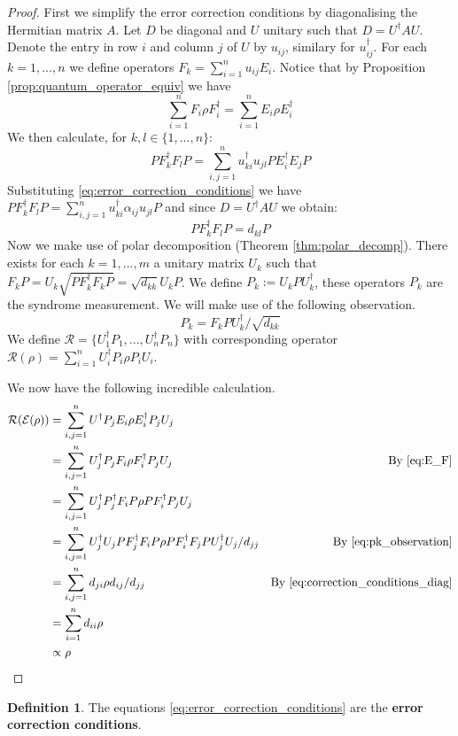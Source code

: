 \documentclass[12pt]{article}
\theoremstyle{plain}
\theoremstyle{definition}
\newtheorem{defn}[thm]{Definition} %
\newcommand{\call}[1]{\mathcal{#1}}
\begin{document}
\begin{proof}
		First we simplify the error correction conditions by diagonalising the Hermitian matrix $A$. Let $D$ be diagonal and $U$ unitary such that $D = U^\dagger A U$. Denote the entry in row $i$ and column $j$ of $U$ by $u_{ij}$, similary for $u_{ij}^\dagger$. For each $k = 1,...,n$ we define operators $F_k = \sum_{i = 1}^n u_{ij}E_i$. Notice that by Proposition \ref{prop:quantum_operator_equiv} we have
		\begin{equation}\label{eq:E_F}
			\sum_{i = 1}^n F_i \rho F_i^\dagger = \sum_{i = 1}^n E_i \rho E_i^\dagger
		\end{equation}
		We then calculate, for $k,l \in \lbrace 1,...,n\rbrace$:
		\begin{equation}
			PF_k^\dagger F_l P = \sum_{i,j = 1}^n u_{ki}^\dagger u_{jl}PE_i^\dagger E_j P
		\end{equation}
		Substituting \eqref{eq:error_correction_conditions} we have $PF_k^\dagger F_lP = \sum_{i,j= 1}^n u_{ki}^\dagger \alpha_{ij}u_{jl}P$ and since $D = U^\dagger A U$ we obtain:
		\begin{equation}\label{eq:correction_conditions_diag}
			PF_k^\dagger F_l P = d_{kl}P
		\end{equation}
		Now we make use of polar decomposition (Theorem \ref{thm:polar_decomp}). There exists for each $k = 1,...,m$ a unitary matrix $U_k$ such that $F_k P = U_k \sqrt{P F_k^\dagger F_k P} = \sqrt{d_{kk}}U_k P$. We define $P_k := U_k P U_k^\dagger$, these operators $P_k$ are the syndrome measurement. We will make use of the following observation.
		\begin{equation}\label{eq:pk_observation}
			P_k = F_k P U_k^\dagger/\sqrt{d_{kk}}
		\end{equation}
		We define $\call{R} = \lbrace U_1^\dagger P_1, ..., U_n^\dagger P_n \rbrace$ with corresponding operator $\call{R}(\rho) = \sum_{i = 1}^n U_i^\dagger P_i \rho P_iU_i$.
		
		We now have the following incredible calculation.
		\begin{align*}
			\call{R}(\call{E}(\rho)) &= \sum_{i,j = 1}^n U^\dagger P_j E_i \rho E_i^\dagger P_j U_j\\
			&= \sum_{i,j = 1}^n U_j^\dagger P_j F_i \rho F_i^\dagger P_j U_j & \text{By }\eqref{eq:E_F}\\
			&= \sum_{i,j = 1}^n U_j^\dagger P_j^\dagger F_i P \rho P F_i^\dagger P_j U_j\\
			&= \sum_{i,j = 1}^n U_j^\dagger U_j P F_j^\dagger F_i P \rho P F_i^\dagger F_j P U_j^\dagger U_j/d_{jj} & \text{By } \eqref{eq:pk_observation}\\
			&= \sum_{i,j = 1}^n d_{ji}\rho d_{ij}/d_{jj} & \text{By }\eqref{eq:correction_conditions_diag}\\
			&= \sum_{i = 1}^n d_{ii} \rho\\
			&\propto \rho
		\end{align*}
	\end{proof}
	\begin{defn}
		The equations \eqref{eq:error_correction_conditions} are the \textbf{error correction conditions}.
	\end{defn}
\end{document}
